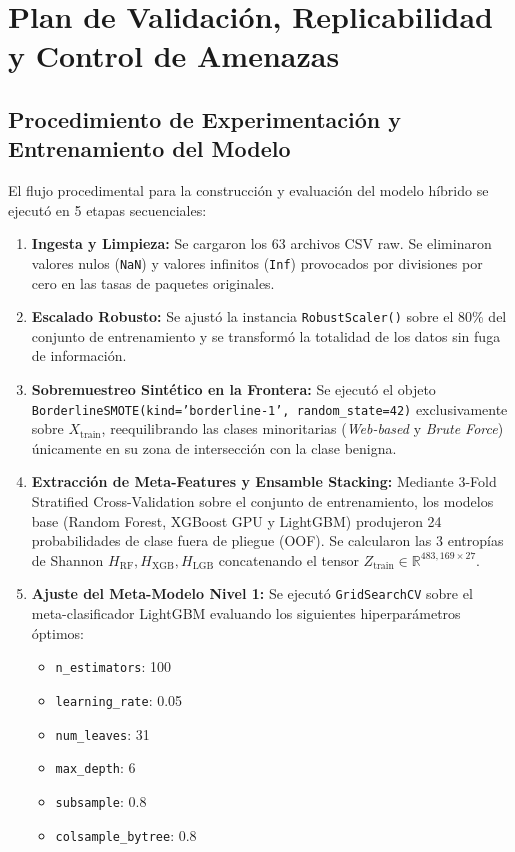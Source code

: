 \section{Plan de Validación, Replicabilidad y Control de Amenazas}

\subsection{Procedimiento de Experimentación y Entrenamiento del Modelo}
El flujo procedimental para la construcción y evaluación del modelo híbrido se ejecutó en 5 etapas secuenciales:

\begin{enumerate}
    \item \textbf{Ingesta y Limpieza:} Se cargaron los 63 archivos CSV raw. Se eliminaron valores nulos (\texttt{NaN}) y valores infinitos (\texttt{Inf}) provocados por divisiones por cero en las tasas de paquetes originales.
    \item \textbf{Escalado Robusto:} Se ajustó la instancia \texttt{RobustScaler()} sobre el 80\% del conjunto de entrenamiento y se transformó la totalidad de los datos sin fuga de información.
    \item \textbf{Sobremuestreo Sintético en la Frontera:} Se ejecutó el objeto \texttt{BorderlineSMOTE(kind='borderline-1', random\_state=42)} exclusivamente sobre $X_{\mathrm{train}}$, reequilibrando las clases minoritarias (\textit{Web-based} y \textit{Brute Force}) únicamente en su zona de intersección con la clase benigna.
    \item \textbf{Extracción de Meta-Features y Ensamble Stacking:} Mediante 3-Fold Stratified Cross-Validation sobre el conjunto de entrenamiento, los modelos base (Random Forest, XGBoost GPU y LightGBM) produjeron 24 probabilidades de clase fuera de pliegue (OOF). Se calcularon las 3 entropías de Shannon $H_{\mathrm{RF}}, H_{\mathrm{XGB}}, H_{\mathrm{LGB}}$ concatenando el tensor $Z_{\mathrm{train}} \in \mathbb{R}^{483,169 \times 27}$.
    \item \textbf{Ajuste del Meta-Modelo Nivel 1:} Se ejecutó \texttt{GridSearchCV} sobre el meta-clasificador LightGBM evaluando los siguientes hiperparámetros óptimos:
    \begin{itemize}
        \item \texttt{n\_estimators}: 100
        \item \texttt{learning\_rate}: 0.05
        \item \texttt{num\_leaves}: 31
        \item \texttt{max\_depth}: 6
        \item \texttt{subsample}: 0.8
        \item \texttt{colsample\_bytree}: 0.8
    \end{itemize}
\end{enumerate}

